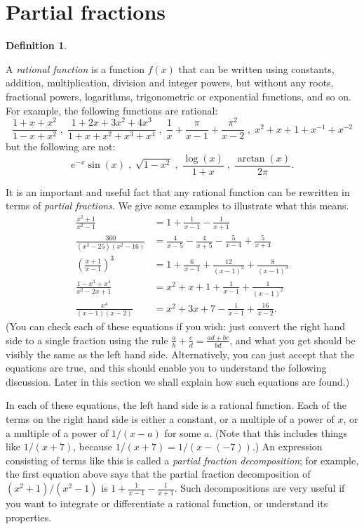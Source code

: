 \documentclass[a4paper]{book}
\newcommand{\PURPLE}[1]{{\color{purple}#1}}
\renewcommand{\:}{\colon}
\newcommand{\bilabel}[1]{\hypertarget{#1}{\label{#1}}}
\newcommand{\DEFN}[1]{\PURPLE{\emph{#1}}}
\theoremstyle{definition}
\newtheorem{definition}[theorem]{Definition}
\begin{document}
\section{Partial fractions}
\label{sec-part-frac}

\begin{definition}\bilabel{defn-rational}
 A \DEFN{rational function} is a function $f(x)$ that can be written
 using constants, addition, multiplication, division and integer
 powers, but without any roots, fractional powers, logarithms,
 trigonometric or exponential functions, and so on.  For example, the
 following functions are rational:
 \[ \frac{1+x+x^2}{1-x+x^2} \;,\;
    \frac{1+2x+3x^2+4x^3}{1+x+x^2+x^3+x^4} \;,\;
    \frac{1}{x} + \frac{\pi}{x-1} + \frac{\pi^2}{x-2} \;,\;
    x^2+x+1+x^{-1}+x^{-2}
 \]
 but the following are not:
 \[ e^{-x}\sin(x) \;,\; \sqrt{1-x^2} \;,\; \frac{\log(x)}{1+x}
    \;,\; \frac{\arctan(x)}{2\pi}.
 \] 
\end{definition}

It is an important and useful fact that any rational function can be
rewritten in terms of \DEFN{partial fractions}.  We give some examples
to illustrate what this means.
\begin{align*}
  \frac{x^2+1}{x^2-1}
   &= 1 + \frac{1}{x-1} - \frac{1}{x+1} \\
  \frac{360}{(x^2-25)(x^2-16)}
   &= \frac{4}{x-5} - \frac{4}{x+5} - \frac{5}{x-4} + \frac{5}{x+4} \\
  \left(\frac{x+1}{x-1}\right)^3
   &= 1 + \frac{6}{x-1} + \frac{12}{(x-1)^2} + \frac{8}{(x-1)^3} \\
  \frac{1-x^3+x^4}{x^2-2x+1}
   &= x^2 + x + 1 + \frac{1}{x-1} + \frac{1}{(x-1)^2} \\
  \frac{x^4}{(x-1)(x-2)}
   &= x^2 + 3x + 7 - \frac{1}{x-1} + \frac{16}{x-2}.
\end{align*}
(You can check each of these equations if you wish: just convert the
right hand side to a single fraction using the rule
$\frac{a}{b}+\frac{c}{d}=\frac{ad+bc}{bd}$, and what you get should be
visibly the same as the left hand side.  Alternatively, you can just
accept that the equations are true, and this should enable you to
understand the following discussion.  Later in this section we shall
explain how such equations are found.)

In each of these equations, the left hand side is a rational function.
Each of the terms on the right hand side is either a constant, or a
multiple of a power of $x$, or a multiple of a power of $1/(x-a)$ for
some $a$.  (Note that this includes things like $1/(x+7)$, because
$1/(x+7)=1/(x-(-7))$.)  An expression consisting of terms like this is
called a \DEFN{partial fraction decomposition}; for example, the first
equation above says that the partial fraction decomposition of
$(x^2+1)/(x^2-1)$ is $1+\frac{1}{x-1}-\frac{1}{x+1}$.  Such
decompositions are very useful if you want to integrate or
differentiate a rational function, or understand its properties.
\end{document}
